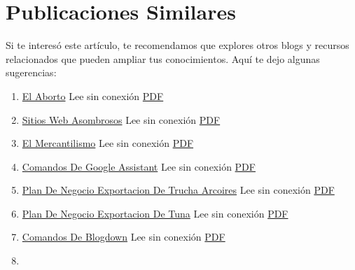 \documentclass[
  stu,
  floatsintext,
  longtable,
  a4paper,
  nolmodern,
  notxfonts,
  notimes,
  colorlinks=true,linkcolor=blue,citecolor=blue,urlcolor=blue]{apa7}
\providecommand{\tightlist}{%
  \setlength{\itemsep}{0pt}\setlength{\parskip}{0pt}}
\begin{document}
\section{Publicaciones Similares}\label{publicaciones-similares}

Si te interesó este artículo, te recomendamos que explores otros blogs y
recursos relacionados que pueden ampliar tus conocimientos. Aquí te dejo
algunas sugerencias:

\begin{enumerate}
\def\labelenumi{\arabic{enumi}.}
\tightlist
\item
  \href{https://achalmaedison.netlify.app/blog/posts/2015-05-14-el-aborto}{El
  Aborto} Lee sin conexión
  \href{https://achalmaedison.netlify.app/blog/posts/2015-05-14-el-aborto/index.pdf}{PDF}
\item
  \href{https://achalmaedison.netlify.app/blog/posts/2017-04-23-sitios-web-asombrosos}{Sitios
  Web Asombrosos} Lee sin conexión
  \href{https://achalmaedison.netlify.app/blog/posts/2017-04-23-sitios-web-asombrosos/index.pdf}{PDF}
\item
  \href{https://achalmaedison.netlify.app/blog/posts/2017-05-23-el-mercantilismo}{El
  Mercantilismo} Lee sin conexión
  \href{https://achalmaedison.netlify.app/blog/posts/2017-05-23-el-mercantilismo/index.pdf}{PDF}
\item
  \href{https://achalmaedison.netlify.app/blog/posts/2020-05-23-comandos-de-google-assistant}{Comandos
  De Google Assistant} Lee sin conexión
  \href{https://achalmaedison.netlify.app/blog/posts/2020-05-23-comandos-de-google-assistant/index.pdf}{PDF}
\item
  \href{https://achalmaedison.netlify.app/blog/posts/2020-09-15-plan-de-negocio-exportacion-de-trucha-arcoires}{Plan
  De Negocio Exportacion De Trucha Arcoires} Lee sin conexión
  \href{https://achalmaedison.netlify.app/blog/posts/2020-09-15-plan-de-negocio-exportacion-de-trucha-arcoires/index.pdf}{PDF}
\item
  \href{https://achalmaedison.netlify.app/blog/posts/2021-07-13-plan-de-negocio-exportacion-de-tuna}{Plan
  De Negocio Exportacion De Tuna} Lee sin conexión
  \href{https://achalmaedison.netlify.app/blog/posts/2021-07-13-plan-de-negocio-exportacion-de-tuna/index.pdf}{PDF}
\item
  \href{https://achalmaedison.netlify.app/blog/posts/2021-07-14-comandos-de-blogdown}{Comandos
  De Blogdown} Lee sin conexión
  \href{https://achalmaedison.netlify.app/blog/posts/2021-07-14-comandos-de-blogdown/index.pdf}{PDF}
\item

\end{enumerate}
\end{document}

